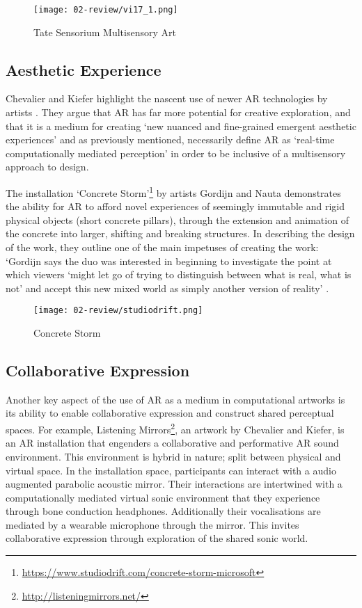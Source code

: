 \begin{figure}[bth]
    \myfloatalign
    {\texttt{[image: 02-review/vi17\_1.png]}}
    \caption[Tate Sensorium Multisensory Art]{Tate Sensorium Multisensory Art}\label{fig: tate}
\end{figure}

\subsection{Aesthetic Experience}\label{sec: literature-arts-aesthetics}
Chevalier and Kiefer highlight the nascent use of newer AR technologies by artists \citeyearpar{chevalier2020}. They argue that AR has far more potential for creative exploration, and that it is a medium for creating `new nuanced and fine-grained emergent aesthetic experiences' and as previously mentioned, necessarily define AR as `real-time computationally mediated perception' in order to be inclusive of a multisensory approach to design. 

The installation `Concrete Storm'\footnote{\url{https://www.studiodrift.com/concrete-storm-microsoft}} by artists Gordijn and Nauta demonstrates the ability for AR to afford novel experiences of seemingly immutable and rigid physical objects (short concrete pillars), through the extension and animation of the concrete into larger, shifting and breaking structures. In describing the design of the work, they outline one of the main impetuses of creating the work: `Gordijn says the duo was interested in beginning to investigate the point at which viewers `might let go of trying to distinguish between what is real, what is not' and accept this new mixed world as simply another version of reality' \citep{gottschalk2017}. 

\begin{figure}[bth]
    \myfloatalign
    {\texttt{[image: 02-review/studiodrift.png]}}
    \caption[Concrete Storm]{Concrete Storm}
\end{figure}\label{fig: concretestorm}

\subsection{Collaborative Expression}\label{sec: literature-arts-collaboration}
Another key aspect of the use of AR as a medium in computational artworks is its ability to enable collaborative expression and construct shared perceptual spaces. For example, Listening Mirrors\footnote{\url{http://listeningmirrors.net/}}, an artwork by Chevalier and Kiefer, \citeyearpar{chevalier2018} is an AR installation that engenders a collaborative and performative AR sound environment. This environment is hybrid in nature; split between physical and virtual space. In the installation space, participants can interact with a audio augmented parabolic acoustic mirror. Their interactions are intertwined with a computationally mediated virtual sonic environment that they experience through bone conduction headphones. Additionally their vocalisations are mediated by a wearable microphone through the mirror. This invites collaborative expression through exploration of the shared sonic world.

